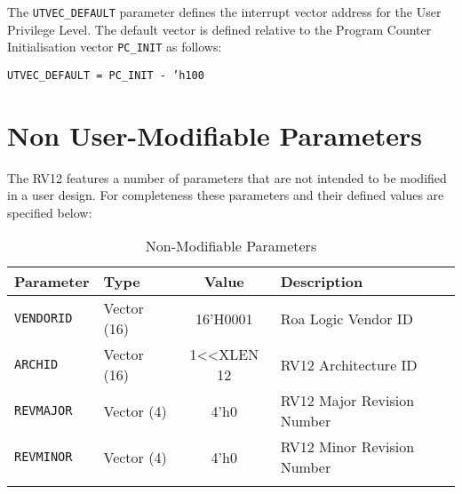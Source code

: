 The \texttt{UTVEC\_DEFAULT} parameter defines the interrupt vector address for
the User Privilege Level. The default vector is defined relative to the
Program Counter Initialisation vector \texttt{PC\_INIT} as follows:

\texttt{UTVEC\_DEFAULT = PC\_INIT - 'h100}

\section{Non User-Modifiable Parameters} \label{non-user-modifiable-parameters}

The RV12 features a number of parameters that are not intended to be
modified in a user design. For completeness these parameters and their
defined values are specified below:

\begin{longtable}[]{@{}llcl@{}}
\toprule
Parameter & Type & Value & Description\tabularnewline
\midrule
\endhead
\texttt{VENDORID} & Vector (16) & 16'H0001 & Roa Logic Vendor ID\tabularnewline
\texttt{ARCHID} & Vector (16) & 1\textless{}\textless{}XLEN \textbar{} 12 & RV12
Architecture ID\tabularnewline
\texttt{REVMAJOR} & Vector (4) & 4'h0 & RV12 Major Revision Number\tabularnewline
\texttt{REVMINOR} & Vector (4) & 4'h0 & RV12 Minor Revision Number\tabularnewline
\bottomrule
\caption{Non-Modifiable Parameters}
\label{tab:nonmod-parameters}
\end{longtable}